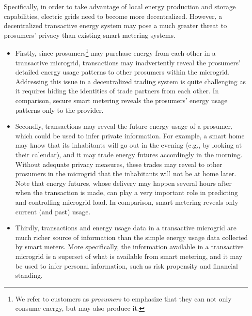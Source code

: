 Specifically, 
in order to take advantage of local energy production and storage capabilities, 
electric grids need to become more decentralized.
However, a decentralized transactive energy system may pose a much greater threat to prosumers' privacy than existing smart metering systems.
\begin{itemize}
\item Firstly, since prosumers\footnote{We refer to customers as \emph{prosumers} to emphasize that they can not only consume energy, but may also produce it.}  may purchase energy from each other in a transactive microgrid, transactions may inadvertently reveal the prosumers' detailed energy usage patterns to other prosumers within the microgrid.
Addressing this issue in a decentralized trading system is quite challenging as it requires hiding the identities of trade partners from each other.
In comparison, secure smart metering reveals the prosumers' energy usage patterns  only to the provider. 
\item Secondly,  transactions may reveal the future energy usage of a prosumer, which could be used to infer private information.
For example, a smart home may know that its inhabitants will go out in the evening (e.g., by looking at their calendar), and it may trade energy futures accordingly in the morning.
Without adequate privacy measures, these trades may reveal to other prosumers in the microgrid that the inhabitants will not be at home later.
Note that energy futures, whose delivery may happen several hours after when the transaction is made, can play a very important role in predicting and controlling microgrid load.
In comparison, smart metering reveals only current (and past) usage.
\item Thirdly, transactions and energy usage data in a transactive microgrid are much richer source of information than the simple energy usage data collected by smart meters.
More specifically, the information available in a transactive microgrid is a superset of what is available from smart metering, and it may be used to infer personal information, such as risk propensity and financial standing.
\end{itemize}

